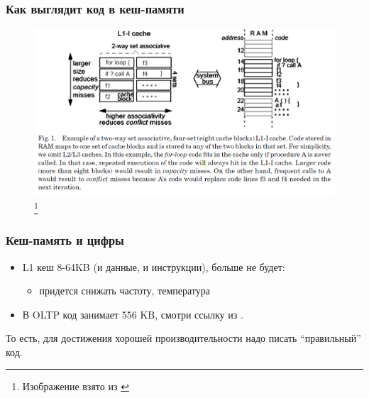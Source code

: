 \documentclass{beamer}
\begin{document}
\begin{frame}
\frametitle{Как выглядит код в кеш-памяти}

\begin{figure}[htb]
\includegraphics[width=\textwidth,height=0.73\textheight,keepaspectratio]{cache2.png} 
\footnote{\tiny{Изображение взято из \cite{Harizopoulos2006}}}
\end{figure}   

\end{frame}

\begin{frame}
\frametitle{Кеш-память и цифры}

\begin{itemize}
  \setlength\itemsep{1em}
  \item L1 кеш 8-64KB (и данные, и инструкции), больше не будет:
  \begin{itemize}
    \item придется снижать частоту, температура
  \end{itemize}
  \item В OLTP код занимает 556 KB, смотри ссылку из \cite{Harizopoulos2006}.
\end{itemize}

То есть, для достижения хорошей производительности надо писать ``правильный'' код.

\end{frame}
\end{document}
